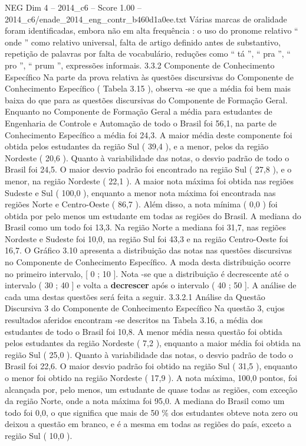 \begin{textsample}{NEG Dim 4 – 2014\_c6 – Score 1.00 – 2014\_c6/enade\_2014\_eng\_contr\_b460d1a0ee.txt}
Várias marcas de oralidade foram identificadas, embora não em alta frequência : o uso do pronome relativo “ onde ” como relativo universal, falta de artigo definido antes de substantivo, repetição de palavras por falta de vocabulário, reduções como “ tá ”, “ pra ”, “ pro ”, “ prum ”, expressões informais. 3.3.2 Componente de Conhecimento Específico Na parte da prova relativa às questões discursivas do Componente de Conhecimento Específico ( Tabela 3.15 ), observa -se que a média foi bem mais baixa do que para as questões discursivas do Componente de Formação Geral.
Enquanto no Componente de Formação Geral a média para estudantes de Engenharia de Controle e Automação de todo o Brasil foi 56,1, na parte de Conhecimento Específico a média foi 24,3.
A maior média deste componente foi obtida pelos estudantes da região Sul ( 39,4 ), e a menor, pelos da região Nordeste ( 20,6 ).
Quanto à variabilidade das notas, o desvio padrão de todo o Brasil foi 24,5.
O maior desvio padrão foi encontrado na região Sul ( 27,8 ), e o menor, na região Nordeste ( 22,1 ).
A maior nota máxima foi obtida nas regiões Sudeste e Sul ( 100,0 ), enquanto a menor nota máxima foi encontrada nas regiões Norte e Centro-Oeste ( 86,7 ).
Além disso, a nota mínima ( 0,0 ) foi obtida por pelo menos um estudante em todas as regiões do Brasil.
A mediana do Brasil como um todo foi 13,3.
Na região Norte a mediana foi 31,7, nas regiões Nordeste e Sudeste foi 10,0, na região Sul foi 43,3 e na região Centro-Oeste foi 16,7.
O Gráfico 3.10 apresenta a distribuição das notas nas questões discursivas no Componente de Conhecimento Específico.
A moda desta distribuição ocorre no primeiro intervalo, [ 0 ; 10 ].
Nota -se que a distribuição é decrescente até o intervalo ( 30 ; 40 ] e volta a \textbf{decrescer} após o intervalo ( 40 ; 50 ].
A análise de cada uma destas questões será feita a seguir. 3.3.2.1 Análise da Questão Discursiva 3 do Componente de Conhecimento Específico Na questão 3, cujos resultados aferidos encontram -se descritos na Tabela 3.16, a média dos estudantes de todo o Brasil foi 10,8.
A menor média nessa questão foi obtida pelos estudantes da região Nordeste ( 7,2 ), enquanto a maior média foi obtida na região Sul ( 25,0 ).
Quanto à variabilidade das notas, o desvio padrão de todo o Brasil foi 22,6.
O maior desvio padrão foi obtido na região Sul ( 31,5 ), enquanto o menor foi obtido na região Nordeste ( 17,9 ).
A nota máxima, 100,0 pontos, foi alcançada por, pelo menos, um estudante de quase todas as regiões, com exceção da região Norte, onde a nota máxima foi 95,0.
A mediana do Brasil como um todo foi 0,0, o que significa que mais de 50 \% dos estudantes obteve nota zero ou deixou a questão em branco, e é a mesma em todas as regiões do país, exceto a região Sul ( 10,0 ).

\end{textsample}
